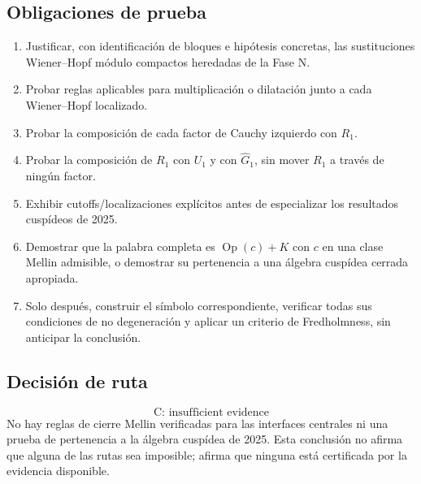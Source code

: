 \subsection*{Obligaciones de prueba}
\begin{enumerate}
\item Justificar, con identificación de bloques e hipótesis concretas, las
sustituciones Wiener--Hopf módulo compactos heredadas de la Fase N.
\item Probar reglas aplicables para multiplicación o dilatación junto a cada
Wiener--Hopf localizado.
\item Probar la composición de cada factor de Cauchy izquierdo con $R_1$.
\item Probar la composición de $R_1$ con $U_1$ y con $\widehat G_1$, sin mover
$R_1$ a través de ningún factor.
\item Exhibir cutoffs/localizaciones explícitos antes de especializar los
resultados cuspídeos de 2025.
\item Demostrar que la palabra completa es $\operatorname{Op}(c)+K$ con $c$ en
una clase Mellin admisible, o demostrar su pertenencia a una álgebra cuspídea
cerrada apropiada.
\item Solo después, construir el símbolo correspondiente, verificar todas sus
condiciones de no degeneración y aplicar un criterio de Fredholmness, sin
anticipar la conclusión.
\end{enumerate}

\subsection*{Decisión de ruta}
\[
\boxed{\text{C: insufficient evidence}}
\]
No hay reglas de cierre Mellin verificadas para las interfaces centrales ni una
prueba de pertenencia a la álgebra cuspídea de 2025. Esta conclusión no afirma
que alguna de las rutas sea imposible; afirma que ninguna está certificada por
la evidencia disponible.
